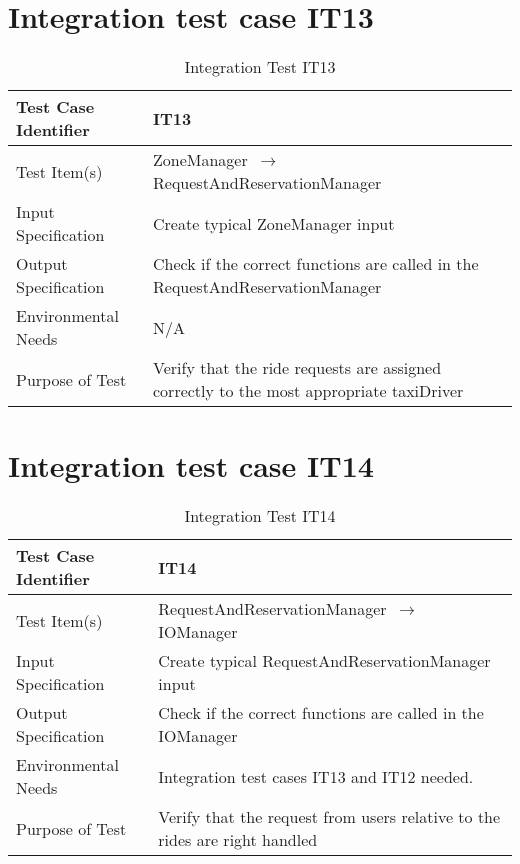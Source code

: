 \documentclass[../../testPlan.tex]{subfiles}
\begin{document}
	\section{Integration test case IT13}
		\begin{table}[H]
			\centering
			\label{IT13}
			\begin{tabular}{ll}
				\hline
				Test Case Identifier & IT13 \\ \hline
				Test Item(s)         & ZoneManager $\,\to\,$ RequestAndReservationManager\\ \hline
				Input Specification  & Create typical ZoneManager input  \\ \hline
				Output Specification & Check if the correct functions are called in the RequestAndReservationManager\\ \hline
				Environmental Needs  &  N/A \\ \hline
				Purpose of Test      &  Verify that the ride requests are assigned correctly to the most appropriate taxiDriver \\ \hline
			\end{tabular}
			\caption{Integration Test IT13}
		\end{table}
		
		
	\section{Integration test case IT14}
		\begin{table}[H]
			\centering
			\label{IT14}
			\begin{tabular}{ll}
				\hline
				Test Case Identifier & IT14 \\ \hline
				Test Item(s)         & RequestAndReservationManager $\,\to\,$ IOManager\\ \hline
				Input Specification  & Create typical RequestAndReservationManager input  \\ \hline
				Output Specification & Check if the correct functions are called in the IOManager\\ \hline
				Environmental Needs  &  Integration test cases IT13 and IT12 needed. \\ \hline
				Purpose of Test      &  Verify that the request from users relative to the rides are right handled  \\ \hline
			\end{tabular}
			\caption{Integration Test IT14}
		\end{table}
		
		
		
\end{document}
